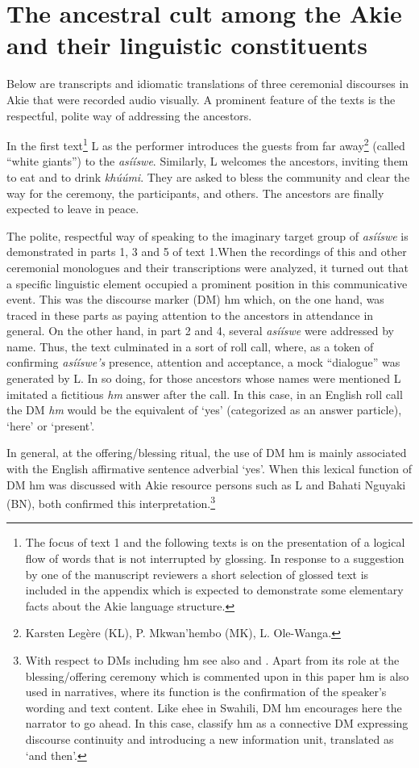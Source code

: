 \documentclass[output=paper,colorlinks,citecolor=brown]{langscibook}
\begin{document}
\section{The  ancestral cult among the Akie and their linguistic constituents}\label{sec:legere:4}

Below are transcripts and idiomatic translations of three ceremonial discourses in Akie that were recorded audio visually. A prominent feature of the texts is the respectful, polite way of addressing the ancestors. 

In the first text\footnote{The focus of text 1 and the following texts is on the presentation of a logical flow of words that is not interrupted by glossing. In response to a suggestion by one of the manuscript reviewers a short selection of glossed text is included in the appendix which is expected to demonstrate some elementary facts about the Akie language structure.}  L as the performer introduces the guests from far away\footnote{Karsten Legère (KL), P. Mkwan’hembo (MK), L. Ole-Wanga.} (called “white giants”) to the \textit{asííswe}. Similarly, L welcomes the ancestors, inviting them to eat and to drink \textit{khúúmi}. They are asked to bless the community and clear the way for the ceremony, the participants, and others. The ancestors are finally expected to leave in peace.

The polite, respectful way of speaking to the imaginary target group of \textit{asííswe} is demonstrated in parts 1, 3 and 5 of text 1.When the recordings of this and other ceremonial monologues and their transcriptions were analyzed, it turned out that a specific linguistic element occupied a prominent position in this communicative event. This was the discourse marker (DM) hm which, on the one hand, was traced in these parts as paying attention to the ancestors in attendance in general. On the other hand, in part 2 and 4, several \textit{asííswe} were addressed by name. Thus, the text culminated in a sort of roll call,  where, as a token of confirming \textit{asííswe’s} presence, attention and acceptance, a mock “dialogue” was generated by L. In so doing, for those ancestors whose names were mentioned L imitated a fictitious \textit{hm} answer after the call. In this case, in an English roll call the DM \textit{hm} would be the equivalent of ‘yes’ (categorized as an answer particle), ‘here’ or ‘present’.

In general, at the offering/blessing ritual, the use of DM hm is mainly associated  with the English affirmative sentence adverbial ‘yes’. When this lexical function of DM hm was discussed with Akie resource persons such as L and Bahati Nguyaki (BN), both confirmed  this interpretation.\footnote{ With respect to DMs including hm see also \cite{HeineEtAl2017} and \cite[137--146]{KonigEtAl2015}. Apart from its role at the blessing/offering ceremony which is commented upon in this paper hm is also used in narratives, where its function is the confirmation of the speaker’s wording and text content. Like ehee in Swahili, DM hm encourages here the narrator to go ahead. In this case, \cite[152]{HeineEtAl2017}  classify hm as a connective DM expressing discourse continuity and introducing a new information unit, translated as ‘and then’.}
\end{document}
